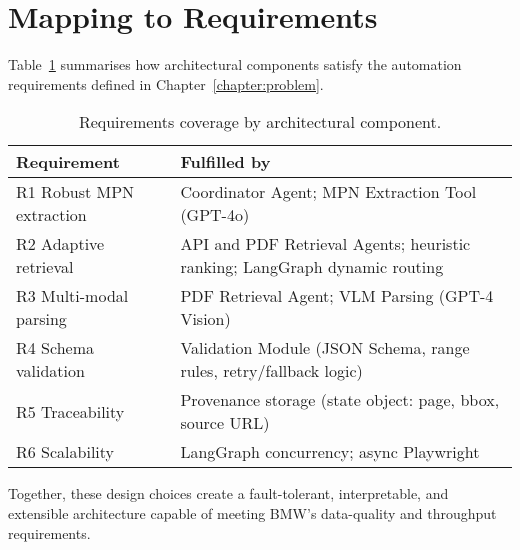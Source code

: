 \section{Mapping to Requirements}
Table~\ref{tab:reqmap} summarises how architectural components satisfy the automation requirements defined in Chapter~\ref{chapter:problem}.

\begin{table}[ht]
  \centering
  \caption{Requirements coverage by architectural component.}
  \label{tab:reqmap}
  \begin{tabular}{p{3.7cm} p{8.8cm}}
    \hline
    \textbf{Requirement} & \textbf{Fulfilled by} \\\hline
    R1 Robust MPN extraction & Coordinator Agent; MPN Extraction Tool (GPT-4o) \\
    R2 Adaptive retrieval & API and PDF Retrieval Agents; heuristic ranking; LangGraph dynamic routing \\
    R3 Multi-modal parsing & PDF Retrieval Agent; VLM Parsing (GPT-4 Vision) \\
    R4 Schema validation & Validation Module (JSON Schema, range rules, retry/fallback logic) \\
    R5 Traceability & Provenance storage (state object: page, bbox, source URL) \\
    R6 Scalability & LangGraph concurrency; async Playwright \\
    \hline
  \end{tabular}
\end{table}

Together, these design choices create a fault-tolerant, interpretable, and extensible architecture capable of meeting BMW's data-quality and throughput requirements.

